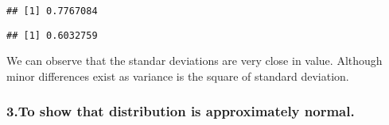 \documentclass[
]{article}
\newenvironment{Shaded}{\begin{snugshade}}{\end{snugshade}}
\newcommand{\KeywordTok}[1]{\textcolor[rgb]{0.13,0.29,0.53}{\textbf{#1}}}
\newcommand{\NormalTok}[1]{#1}
\newcommand{\OperatorTok}[1]{\textcolor[rgb]{0.81,0.36,0.00}{\textbf{#1}}}
\newcommand{\StringTok}[1]{\textcolor[rgb]{0.31,0.60,0.02}{#1}}
\begin{document}
\begin{Shaded}
\end{Shaded}

\begin{verbatim}
## [1] 0.7767084
\end{verbatim}

\begin{Shaded}
\end{Shaded}

\begin{verbatim}
## [1] 0.6032759
\end{verbatim}

We can observe that the standar deviations are very close in value.
Although minor differences exist as variance is the square of standard
deviation.

\hypertarget{to-show-that-distribution-is-approximately-normal.}{%
\subsubsection{3.To show that distribution is approximately
normal.}\label{to-show-that-distribution-is-approximately-normal.}}
\end{document}
